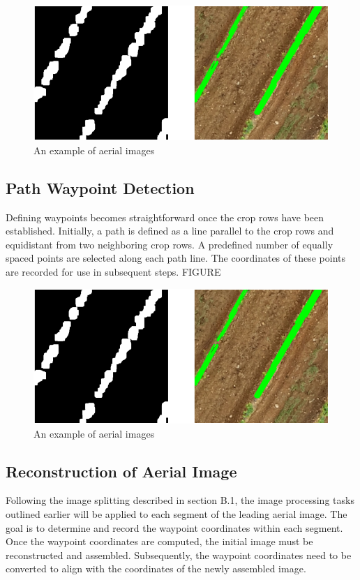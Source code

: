 \documentclass[conference]{IEEEtran}
\begin{document}
\begin{figure}[htbp]
\includegraphics[width=\linewidth]{Hough initial2.png}
\caption{An example of aerial images}
\label{fig1}
\end{figure}

\subsection{Path Waypoint Detection}
Defining waypoints becomes straightforward once the crop rows have been established. Initially, a path is defined as a line parallel to the crop rows and equidistant from two neighboring crop rows. A predefined number of equally spaced points are selected along each path line. The coordinates of these points are recorded for use in subsequent steps. FIGURE

\begin{figure}[htbp]
\includegraphics[width=\linewidth]{Hough initial2.png}
\caption{An example of aerial images}
\label{fig1}
\end{figure}


\subsection{Reconstruction of Aerial Image}
Following the image splitting described in section B.1, the image processing tasks outlined earlier will be applied to each segment of the leading aerial image. The goal is to determine and record the waypoint coordinates within each segment. Once the waypoint coordinates are computed, the initial image must be reconstructed and assembled. Subsequently, the waypoint coordinates need to be converted to align with the coordinates of the newly assembled image.
\end{document}
